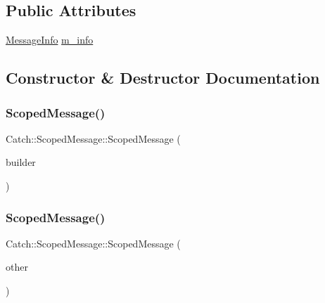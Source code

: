 \subsection*{Public Attributes}
\begin{DoxyCompactItemize}
\item 
\hyperlink{struct_catch_1_1_message_info}{Message\+Info} \hyperlink{class_catch_1_1_scoped_message_ae6e1476f389cc6e1586f033b3747b27b}{m\+\_\+info}
\end{DoxyCompactItemize}


\subsection{Constructor \& Destructor Documentation}
\hypertarget{class_catch_1_1_scoped_message_a5cc59f0f2ebe840e6607f83004d49a17}{}\label{class_catch_1_1_scoped_message_a5cc59f0f2ebe840e6607f83004d49a17} 
\subsubsection{\texorpdfstring{Scoped\+Message()}{ScopedMessage()}\hspace{0.1cm}{\footnotesize\ttfamily [1/2]}}
{\footnotesize\ttfamily Catch\+::\+Scoped\+Message\+::\+Scoped\+Message (\begin{DoxyParamCaption}\item[{\hyperlink{struct_catch_1_1_message_builder}{Message\+Builder} const \&}]{builder }\end{DoxyParamCaption})}

\hypertarget{class_catch_1_1_scoped_message_ae03a17fd47220d563d4abc73e7518e29}{}\label{class_catch_1_1_scoped_message_ae03a17fd47220d563d4abc73e7518e29} 
\subsubsection{\texorpdfstring{Scoped\+Message()}{ScopedMessage()}\hspace{0.1cm}{\footnotesize\ttfamily [2/2]}}
{\footnotesize\ttfamily Catch\+::\+Scoped\+Message\+::\+Scoped\+Message (\begin{DoxyParamCaption}\item[{\hyperlink{class_catch_1_1_scoped_message}{Scoped\+Message} const \&}]{other }\end{DoxyParamCaption})}

